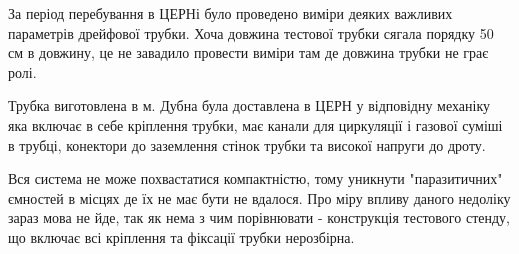 \documentclass[pdftex,14pt]{scrartcl}
\begin{document}
\begin{spacing}{1.5}

	 	
	За період перебування в ЦЕРНі було проведено виміри деяких важливих параметрів дрейфової трубки.	Хоча довжина тестової трубки сягала порядку 50 см в довжину, це не завадило провести виміри там де довжина трубки не грає ролі.
	
	Трубка виготовлена в м. Дубна була доставлена в ЦЕРН у відповідну механіку яка включає в себе кріплення трубки, має канали для циркуляції і газової суміші в трубці, конектори до заземлення стінок трубки та високої напруги до дроту.
	
	Вся система не може похвастатися компактністю, тому уникнути "паразитичних" ємностей в місцях де їх не має бути не вдалося. Про міру впливу даного недоліку зараз мова не йде, так як нема з чим порівнювати - конструкція тестового стенду, що включає всі кріплення та фіксації трубки нерозбірна.
	
	
	
	
	\begin{figure}[!h]
	\centering
\end{figure}
\end{spacing}
\end{document}
